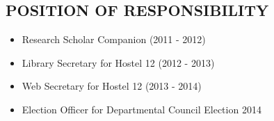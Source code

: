 \documentclass[line,margin]{res}
\begin{document}
\begin{resume}
\section{POSITION OF RESPONSIBILITY}

\begin{itemize}
\item Research Scholar Companion (2011 - 2012)  
\item Library Secretary for Hostel 12 (2012 - 2013)
\item Web Secretary for Hostel 12 (2013 - 2014)
\item Election Officer for Departmental Council Election 2014 
\end{itemize}
                
 \end{resume}
\end{document}
